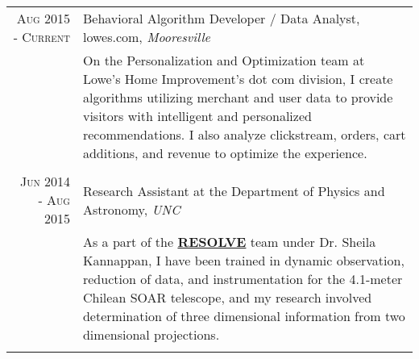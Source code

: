 \documentclass[a4paper,10pt]{article} %
\begin{document}
\begin{tabular}{r|p{11cm}}

\textsc{Aug 2015 - Current} & Behavioral Algorithm Developer / Data Analyst, lowes.com, \emph{Mooresville} \\
& \footnotesize{On the Personalization and Optimization team at Lowe's Home Improvement's dot com division, I create algorithms utilizing merchant and user data to provide visitors with intelligent and personalized recommendations. I also analyze clickstream, orders, cart additions, and revenue to optimize the experience.}\\
\multicolumn{2}{c}{} \\


\textsc{Jun 2014 - Aug 2015} & Research Assistant at the Department of Physics and Astronomy, \emph{UNC} \\ 
& \footnotesize{As a part of the \textbf{\href{http://resolve.astro.unc.edu/}{RESOLVE}} team under Dr. Sheila Kannappan, I have been trained in dynamic observation, reduction of data, and instrumentation for the 4.1-meter Chilean SOAR telescope, and my research involved determination of three dimensional information from two dimensional projections.}\\
\multicolumn{2}{c}{} \\


\end{tabular}
\end{document}
